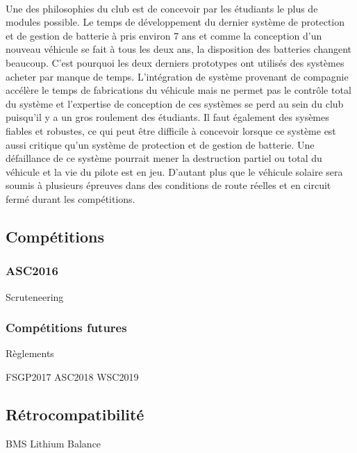 \documentclass[12pt,letterpaper]{article}
\begin{document}
\paragraph{}
Une des philosophies du club est de concevoir par les étudiants le plus de modules possible. Le temps de développement du dernier système de protection et de gestion de batterie à pris environ 7 ans et comme la conception d'un nouveau véhicule se fait à tous les deux ans, la disposition des batteries changent beaucoup. C'est pourquoi les deux derniers prototypes ont utilisés des systèmes acheter par manque de temps. L'intégration de système provenant de compagnie accélère le temps de fabrications du véhicule mais ne permet pas le contrôle total du système et l'expertise de conception de ces systèmes se perd au sein du club puisqu'il y a un gros roulement des étudiants. Il faut également des sysèmes fiables et robustes, ce qui peut être difficile à concevoir lorsque ce système est aussi critique qu'un système de protection et de gestion de batterie. Une défaillance de ce système pourrait mener la destruction partiel ou total du véhicule et la vie du pilote est en jeu. D'autant plus que le véhicule solaire sera soumis à plusieurs épreuves dans des conditions de route réelles et en circuit fermé durant les compétitions.

\subsection{Compétitions}


\subsubsection{ASC2016}

Scruteneering

\subsubsection{Compétitions futures}

Règlements


FSGP2017
ASC2018
WSC2019



\subsection{Rétrocompatibilité}



BMS Lithium Balance

%
%
%
%
\end{document}
